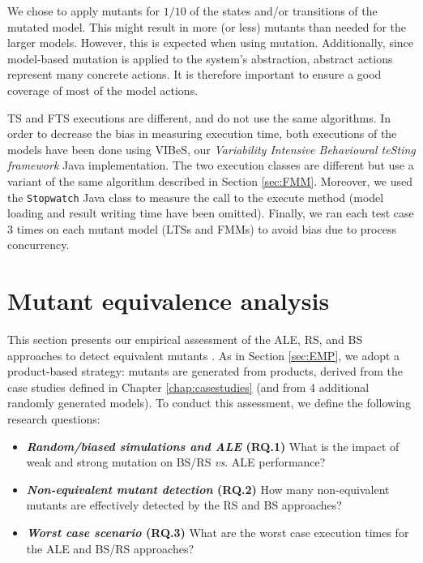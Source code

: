 We chose to apply mutants for $1/10$ of the states and/or transitions of the mutated model. This might result in more (or less) mutants than needed for the larger models. However, this is expected when using mutation. Additionally, since model-based mutation is applied to the system's abstraction, abstract actions represent many concrete actions. It is therefore important to ensure a good coverage of most of the model actions.

TS and FTS executions are different, and do not use the same algorithms. In order to decrease the bias in measuring execution time, both executions of the models have been done using VIBeS, our \emph{Variability Intensive Behavioural teSting framework} Java implementation. The two execution classes are different but use a variant of the same algorithm described in Section \ref{sec:FMM}. Moreover, we used the \texttt{Stopwatch} Java class to measure the call to the execute method (\ie model loading and result writing time have been omitted). 
Finally, we ran each test case 3 times on each mutant model (LTSs and FMMs) to avoid bias due to process concurrency.

%


\section{Mutant equivalence analysis}

\label{sec:experiment:mutequiv}

       

This section presents our empirical assessment of the \gls{ALE}, \gls{RS}, and \gls{BS} approaches to detect equivalent mutants \cite{Devroey2017}. As in Section \ref{sec:EMP}, we adopt a product-based strategy: mutants are generated from products, derived from the case studies defined in Chapter \ref{chap:casestudies} (and from 4 additional randomly generated models). To conduct this assessment, we define the following research questions:
\begin{itemize}
\item \textbf{\textit{Random/biased simulations and ALE} (RQ.1) } What is the impact of weak and strong mutation on BS/RS \textit{vs}. ALE performance?
\item \textbf{\textit{Non-equivalent mutant detection} (RQ.2) } How many non-equivalent mutants are effectively detected by the RS and BS appro\-aches?
\item \textbf{\textit{Worst case scenario} (RQ.3) } What are the worst case execution times for the ALE and BS/RS approaches?
\end{itemize}

